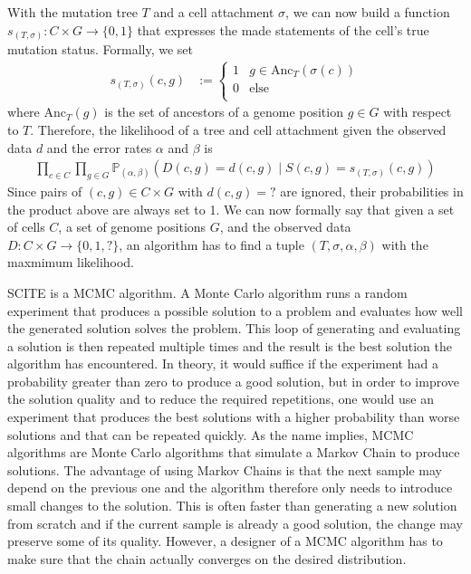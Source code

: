 With the mutation tree $T$ and a cell attachment $\sigma$, we can now build a function $s_{(T, \sigma)}: C \times G \rightarrow \{0, 1\}$ that expresses the made statements of the cell's true mutation status. Formally, we set
\begin{align*}
    s_{(T, \sigma)}(c, g) &:= \begin{cases}
        1 & g \in \mathrm{Anc}_T(\sigma(c)) \\
        0 & \text{else} \\
    \end{cases}
\end{align*}
where $\mathrm{Anc}_T(g)$ is the set of ancestors of a genome position $g \in G$ with respect to $T$. Therefore, the likelihood of a tree and cell attachment given the observed data $d$ and the error rates $\alpha$ and $\beta$ is
\begin{align*}
    \prod_{c \in C}\prod_{g \in G} \mathbb{P}_{(\alpha, \beta)}(D(c, g) = d(c, g) \mid S(c, g) = s_{(T, \sigma)}(c, g))
\end{align*}
Since pairs of $(c, g) \in C \times G$ with $d(c, g) = ?$ are ignored, their probabilities in the product above are always set to 1. We can now formally say that given a set of cells $C$, a set of genome positions $G$, and the observed data $D: C \times G \rightarrow \{0, 1, ?\}$, an algorithm has to find a tuple $(T, \sigma, \alpha, \beta)$ with the maxmimum likelihood.

\ac{SCITE} is a \ac{MCMC} algorithm. A Monte Carlo algorithm runs a random experiment that produces a possible solution to a problem and evaluates how well the generated solution solves the problem. This loop of generating and evaluating a solution is then repeated multiple times and the result is the best solution the algorithm has encountered. In theory, it would suffice if the experiment had a probability greater than zero to produce a good solution, but in order to improve the solution quality and to reduce the required repetitions, one would use an experiment that produces the best solutions with a higher probability than worse solutions and that can be repeated quickly. As the name implies, \ac{MCMC} algorithms are Monte Carlo algorithms that simulate a Markov Chain to produce solutions. The advantage of using Markov Chains is that the next sample may depend on the previous one and the algorithm therefore only needs to introduce small changes to the solution. This is often faster than generating a new solution from scratch and if the current sample is already a good solution, the change may preserve some of its quality. However, a designer of a \ac{MCMC} algorithm has to make sure that the chain actually converges on the desired distribution.

